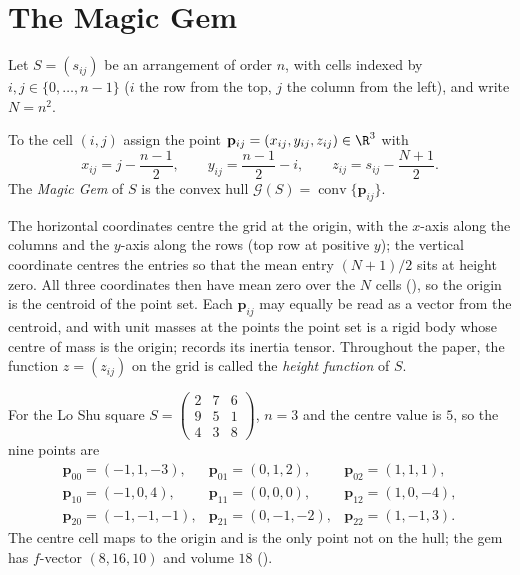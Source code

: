 \section{The Magic Gem}
\label{sec:gem}

Let $S=(s_{ij})$ be an arrangement of order $n$, with cells indexed by $i,j\in\{0,\dots,n-1\}$ ($i$ the row from the top, $j$ the column from the left), and write $N=n^2$.

\begin{definition}
\label{def:gem_coords}
To the cell $(i,j)$ assign the point $\mathbf p_{ij}=(x_{ij},y_{ij},z_{ij})\in\R^3$ with
\begin{equation}
x_{ij}=j-\frac{n-1}{2},\qquad y_{ij}=\frac{n-1}{2}-i,\qquad z_{ij}=s_{ij}-\frac{N+1}{2}.
\label{eq:gem_coords}
\end{equation}
The \emph{Magic Gem} of $S$ is the convex hull $\mathcal G(S)=\operatorname{conv}\{\mathbf p_{ij}\}$.
\end{definition}

The horizontal coordinates centre the grid at the origin, with the $x$-axis along the columns and the $y$-axis along the rows (top row at positive $y$); the vertical coordinate centres the entries so that the mean entry $(N+1)/2$ sits at height zero.
All three coordinates then have mean zero over the $N$ cells (), so the origin is the centroid of the point set.
Each $\mathbf p_{ij}$ may equally be read as a vector from the centroid, and with unit masses at the points the point set is a rigid body whose centre of mass is the origin;  records its inertia tensor.
Throughout the paper, the function $z=(z_{ij})$ on the grid is called the \emph{height function} of $S$.

\begin{example}[Lo Shu]
\label{ex:loshu}
For the Lo Shu square $S=\begin{pmatrix}2&7&6\\9&5&1\\4&3&8\end{pmatrix}$, $n=3$ and the centre value is $5$, so the nine points are
\[
\begin{array}{lll}
\mathbf p_{00}=(-1,1,-3), & \mathbf p_{01}=(0,1,2), & \mathbf p_{02}=(1,1,1),\\
\mathbf p_{10}=(-1,0,4), & \mathbf p_{11}=(0,0,0), & \mathbf p_{12}=(1,0,-4),\\
\mathbf p_{20}=(-1,-1,-1), & \mathbf p_{21}=(0,-1,-2), & \mathbf p_{22}=(1,-1,3).
\end{array}
\]
The centre cell maps to the origin and is the only point not on the hull; the gem has $f$-vector $(8,16,10)$ and volume $18$ ().
\end{example}

